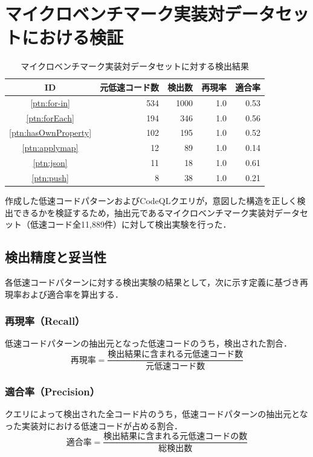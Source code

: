 \documentclass[11pt]{jreport}
\begin{document}
\section{マイクロベンチマーク実装対データセットにおける検証}
\label{sec:toMB}

\begin{table}[ht]
    \centering
    \caption{マイクロベンチマーク実装対データセットに対する検出結果}
    \label{tab:result_detectToMB}
    \begin{tabular}{crrrr}
        \toprule
        \textbf{ID} & \textbf{元低速コード数} & \textbf{検出数} & \textbf{再現率} & \textbf{適合率} \\
        \midrule           
        \ref{ptn:for-in} & 534 & 1000 & 1.0 & 0.53 \\
        \ref{ptn:forEach} & 194 & 346 & 1.0 & 0.56 \\
        \ref{ptn:hasOwnProperty} & 102 & 195 & 1.0 & 0.52 \\
        \ref{ptn:applymap} & 12 & 89 & 1.0 & 0.14 \\
        \ref{ptn:json} & 11 & 18 & 1.0 & 0.61 \\
        \ref{ptn:push} & 8 & 38 & 1.0 & 0.21 \\
        \bottomrule
    \end{tabular}
\end{table}

作成した低速コードパターンおよびCodeQLクエリが，意図した構造を正しく検出できるかを検証するため，抽出元であるマイクロベンチマーク実装対データセット（低速コード全11,889件）に対して検出実験を行った．


\subsection{検出精度と妥当性}
各低速コードパターンに対する検出実験の結果として，次に示す定義に基づき再現率および適合率を算出する．

\subsubsection{再現率（Recall）}
低速コードパターンの抽出元となった低速コードのうち，検出された割合．
$$\text{再現率} = \frac{\text{検出結果に含まれる元低速コード数}}{\text{元低速コード数}}$$

\subsubsection{適合率（Precision）}
クエリによって検出された全コード片のうち，低速コードパターンの抽出元となった実装対における低速コードが占める割合．
$$\text{適合率} = \frac{\text{検出結果に含まれる元低速コードの数}}{\text{総検出数}}$$
\end{document}
